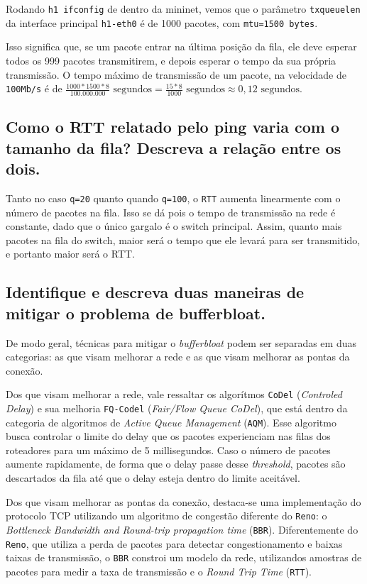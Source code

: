 \documentclass[a4paper,12pt]{article}
\newcommand{\code}[1]{\texttt{#1}}
\begin{document}
Rodando \code{h1 ifconfig} de dentro da mininet, vemos que o parâmetro \code{txqueuelen} da interface principal \code{h1-eth0} é de 1000 pacotes, com \code{mtu=1500 bytes}.

Isso significa que, se um pacote entrar na última posição da fila, ele deve esperar todos os 999 pacotes transmitirem, e depois esperar o tempo da sua própria transmissão. O tempo máximo de transmissão de um pacote, na velocidade de \code{100Mb/s} é de $\frac{1000 * 1500 * 8}{100.000.000} \text{ segundos} = \frac{15 * 8}{1000} \text{ segundos} \approx 0,12 \text{ segundos} $. 

\subsection{Como o RTT relatado pelo ping varia com o tamanho da fila? Descreva a relação entre os dois.}

Tanto no caso \code{q=20} quanto quando \code{q=100}, o \code{RTT} aumenta linearmente com o número de pacotes na fila. Isso se dá pois o tempo de transmissão na rede é constante, dado que o único gargalo é o switch principal. Assim, quanto mais pacotes na fila do switch, maior será o tempo que ele levará para ser transmitido, e portanto maior será o RTT.

\subsection{Identifique e descreva duas maneiras de mitigar o problema de bufferbloat.}

De modo geral, técnicas para mitigar o \textit{bufferbloat} podem ser separadas em duas categorias: as que visam melhorar a rede e as que visam melhorar as pontas da conexão.

Dos que visam melhorar a rede, vale ressaltar os algorítmos \code{CoDel} (\textit{Controled Delay}) e sua melhoria \code{FQ-Codel} (\textit{Fair/Flow Queue CoDel}), que está dentro da categoria de algoritmos de \textit{Active Queue Management} (\code{AQM}). Esse algoritmo busca controlar o limite do delay que os pacotes experienciam nas filas dos roteadores para um máximo de 5 millisegundos. Caso o número de pacotes aumente rapidamente, de forma que o delay passe desse \textit{threshold}, pacotes são descartados da fila até que o delay esteja dentro do limite aceitável.

Dos que visam melhorar as pontas da conexão, destaca-se uma implementação do protocolo TCP utilizando um algoritmo de congestão diferente do \code{Reno}: o \textit{Bottleneck Bandwidth and Round-trip propagation time} (\code{BBR}). Diferentemente do \code{Reno}, que utiliza a perda de pacotes para detectar congestionamento e baixas taixas de transmissão, o \code{BBR} constroi um modelo da rede, utilizandos amostras de pacotes para medir a taxa de transmissão e o \textit{Round Trip Time} (\code{RTT}).
\end{document}
